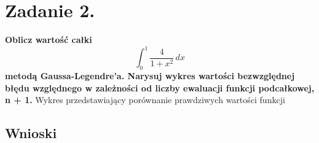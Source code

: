 \documentclass{article}
\begin{document}
\section*{Zadanie 2.}
\textbf{Oblicz wartość całki $$ \int_{0}^{1} \frac{4}{1+x^2} \,dx $$
metodą Gaussa-Legendre’a. Narysuj wykres wartości bezwzględnej
błędu względnego w zależności od liczby ewaluacji funkcji
podcałkowej, n + 1.}
\newpage
Wykres przedstawiający porównanie prawdziwych wartości funkcji 


\subsection*{Wnioski}
\null\quad 
\end{document}
